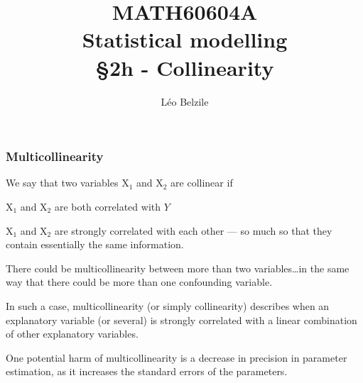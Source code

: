\documentclass{beamer}
\title[\color{white}{MATH60604A Collinearity}]{\texorpdfstring{MATH60604A \\Statistical modelling \\ \S 2h - Collinearity}{MATH60604A \\Statistical modelling \\ \S~2h - Collinearity}}
\author{Léo Belzile}
\institute{HEC Montréal\\
Department of Decision Sciences}
\date{}
\begin{document}
\frame{\titlepage}


\begin{frame}
\frametitle{Multicollinearity}
\bi
\item We say that two variables $\mathrm{X}_1$ and $\mathrm{X}_2$ are \alert{collinear} if
\bi
\vp
\item $\mathrm{X}_1$ and $\mathrm{X}_2$ are both correlated with $Y$
\item $\mathrm{X}_1$ and $\mathrm{X}_2$ are strongly correlated with each other --- so much so that they contain essentially the same information.
\ei
\item There could be multicollinearity between more than two variables\ldots in the same way that there could be more than one confounding variable.
\item In such a case, \alert{multicollinearity} (or simply collinearity) describes when an explanatory variable (or several) is strongly correlated with a linear combination of other explanatory variables.
\item One potential harm of multicollinearity is a \alert{decrease in precision} in parameter estimation, as it increases the standard errors of the parameters. 
\ei
\end{frame}

% 
\end{document}
